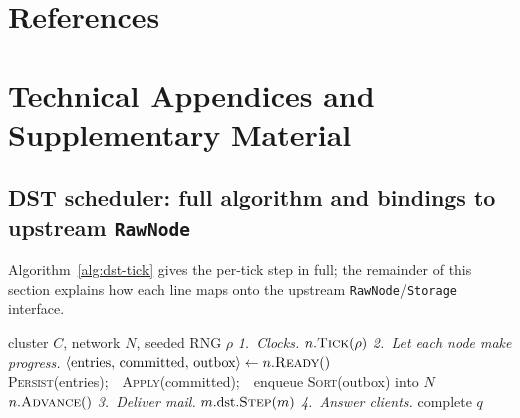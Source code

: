 \documentclass{article}
\begin{document}
\section*{References}
\medskip
{
\renewcommand{\section}[2]{}%
\small


}

\appendix
\section{Technical Appendices and Supplementary Material}

\subsection{DST scheduler: full algorithm and bindings to upstream
            \texttt{RawNode}}
\label{app:dst-detail}

Algorithm~\ref{alg:dst-tick} gives the per-tick step in full; the
remainder of this section explains how each line maps onto the
upstream \texttt{RawNode}/\texttt{Storage} interface.

\begin{algorithm}
\caption{One simulator tick (deterministic, single-threaded).}
\label{alg:dst-tick}
\begin{algorithmic}[1]
\Require cluster $C$, network $N$, seeded RNG $\rho$
\Statex \textit{1.\ Clocks.}
  \State $n.\textsc{Tick}(\rho)$ 
\EndFor
\Statex \textit{2.\ Let each node make progress.}
  \State $\langle\text{entries},\,\text{committed},\,\text{outbox}\rangle
         \gets n.\textsc{Ready}()$
  \State \textsc{Persist}(entries);\ \ \textsc{Apply}(committed);\ \
         enqueue \textsc{Sort}(outbox) into $N$
  \State $n.\textsc{Advance}()$
\EndFor
\Statex \textit{3.\ Deliver mail.}
  \State $m.\text{dst}.\textsc{Step}(m)$
\EndFor
\Statex \textit{4.\ Answer clients.}
  \State complete $q$
\EndFor
\end{algorithmic}
\end{algorithm}
\end{document}
